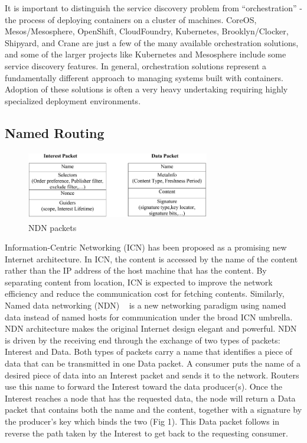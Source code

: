 It is important to distinguish the service discovery problem from “orchestration” - the process of deploying containers on a cluster of machines. CoreOS, Mesos/Mesosphere, OpenShift, CloudFoundry, Kubernetes, Brooklyn/Clocker, Shipyard, and Crane are just a few of the many available orchestration solutions, and some of the larger projects like Kubernetes and Mesosphere include some service discovery features. In general, orchestration solutions represent a fundamentally different approach to managing systems built with containers. Adoption of these solutions is often a very heavy undertaking requiring highly specialized deployment environments.

\subsection{Named Routing}

\begin{figure}
\centering
\includegraphics[height=3cm, width=8cm]{figs/ndn_packet.png}
\caption{\label{fig:ndn}NDN packets~\cite{ndn}}
\end{figure}
Information-Centric Networking (ICN) has been proposed as a promising new Internet architecture. In ICN, the content is accessed by the name of the content rather than the IP address of the host machine that has the content. By separating content from location, ICN is expected to improve the network efficiency and reduce the communication cost for fetching contents.  Similarly, Named data networking (NDN) ~\cite{ndn} is a new networking paradigm using named data instead of named hosts for communication under the broad ICN umbrella. NDN architecture makes the original Internet design elegant and powerful. NDN is driven by the receiving end through the exchange of two types of packets:
Interest and Data. Both types of packets carry a name that identifies a piece of data that can be transmitted in one Data packet. A consumer puts the name of a desired piece of data into an Interest packet and sends it to the network. Routers use this name to forward the Interest toward the data producer(s). Once the Interest reaches a node that has the requested data, the node will return a Data packet that contains both the name and the content, together with a signature by the producer’s key which binds the two (Fig 1). This Data packet follows in reverse the path taken by the Interest to get back to the requesting consumer. 

